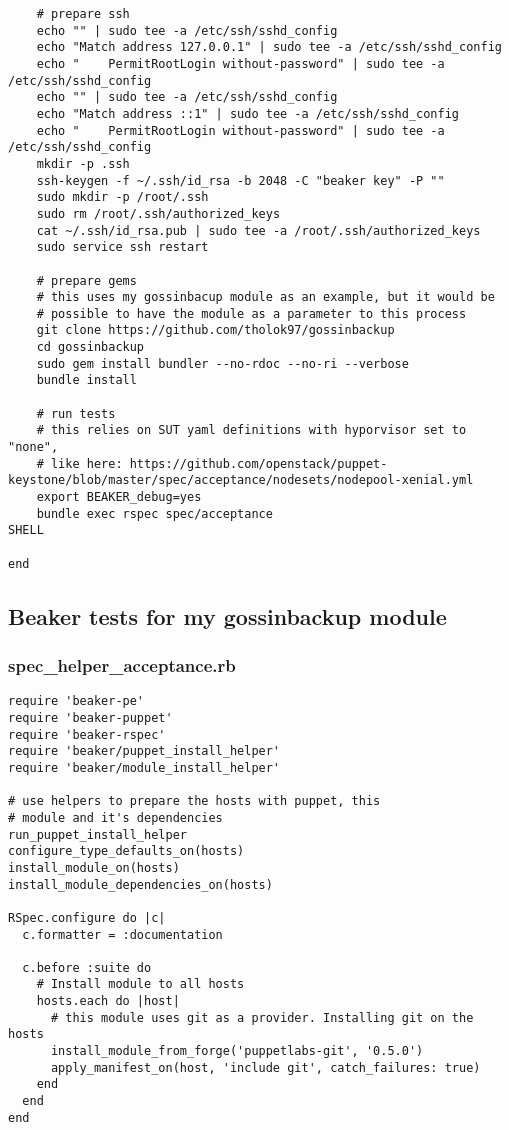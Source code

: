 \begin{verbatim}
    # prepare ssh
    echo "" | sudo tee -a /etc/ssh/sshd_config
    echo "Match address 127.0.0.1" | sudo tee -a /etc/ssh/sshd_config
    echo "    PermitRootLogin without-password" | sudo tee -a /etc/ssh/sshd_config
    echo "" | sudo tee -a /etc/ssh/sshd_config
    echo "Match address ::1" | sudo tee -a /etc/ssh/sshd_config
    echo "    PermitRootLogin without-password" | sudo tee -a /etc/ssh/sshd_config
    mkdir -p .ssh
    ssh-keygen -f ~/.ssh/id_rsa -b 2048 -C "beaker key" -P ""
    sudo mkdir -p /root/.ssh
    sudo rm /root/.ssh/authorized_keys
    cat ~/.ssh/id_rsa.pub | sudo tee -a /root/.ssh/authorized_keys
    sudo service ssh restart
   
    # prepare gems
    # this uses my gossinbacup module as an example, but it would be
    # possible to have the module as a parameter to this process
    git clone https://github.com/tholok97/gossinbackup
    cd gossinbackup
    sudo gem install bundler --no-rdoc --no-ri --verbose
    bundle install

    # run tests
    # this relies on SUT yaml definitions with hyporvisor set to "none",
    # like here: https://github.com/openstack/puppet-keystone/blob/master/spec/acceptance/nodesets/nodepool-xenial.yml
    export BEAKER_debug=yes
    bundle exec rspec spec/acceptance
SHELL

end
\end{verbatim}

\subsection{Beaker tests for my gossinbackup module} \label{gossinbackuptests}

\subsubsection{spec\_helper\_acceptance.rb}

\begin{verbatim}
require 'beaker-pe'
require 'beaker-puppet'
require 'beaker-rspec'
require 'beaker/puppet_install_helper'
require 'beaker/module_install_helper'

# use helpers to prepare the hosts with puppet, this
# module and it's dependencies
run_puppet_install_helper
configure_type_defaults_on(hosts)
install_module_on(hosts)
install_module_dependencies_on(hosts)

RSpec.configure do |c|
  c.formatter = :documentation

  c.before :suite do
    # Install module to all hosts
    hosts.each do |host|
      # this module uses git as a provider. Installing git on the hosts
      install_module_from_forge('puppetlabs-git', '0.5.0')
      apply_manifest_on(host, 'include git', catch_failures: true)
    end
  end
end
\end{verbatim}

